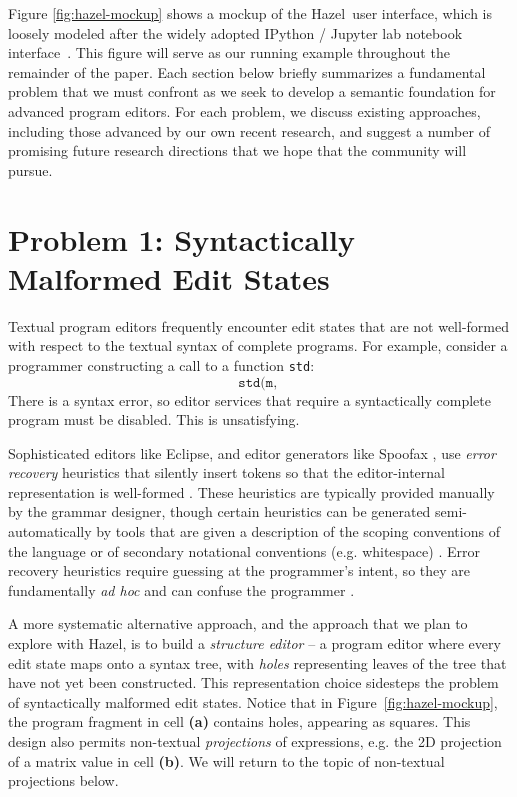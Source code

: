 \documentclass[letterpaper,USenglish]{lipics-v2016}
\newcommand{\Hazel}[0]{\textsf{Hazel}}
\newcommand{\HazelEnv}[0]{\Hazel}
\begin{document}
Figure \ref{fig:hazel-mockup} shows a mockup of the \Hazel ~user interface, which is loosely modeled after the widely adopted IPython / Jupyter lab notebook interface~\cite{PER-GRA:2007}. 
This figure will serve as our running example 
throughout the remainder of the paper. Each section below briefly summarizes a fundamental problem that we must confront as we seek to develop a semantic foundation for advanced program editors. For each problem, we discuss existing approaches, including those advanced by our own recent research, and suggest a number of promising future research directions that we hope that the community will pursue.

\section{Problem 1: Syntactically Malformed Edit States} 
Textual program editors frequently encounter edit states
that are not well-formed with respect to the textual syntax of complete
programs. For example, consider a programmer constructing a call to a function \lstinline{std}: 
\[
\texttt{std(m, }
\]
There is a syntax error, so editor services that require a syntactically
complete program must be disabled. This is unsatisfying. 

Sophisticated editors like Eclipse, and editor generators like Spoofax \cite{DBLP:conf/oopsla/KatsV10}, use \emph{error recovery} heuristics that silently insert tokens so that the editor-internal representation is well-formed \cite{DBLP:journals/siamcomp/AhoP72,charles1991practical,graham1979practical,DBLP:conf/oopsla/KatsJNV09}. These heuristics are typically provided manually by the grammar designer, though certain heuristics can be generated semi-automatically by tools that are given a description of the scoping conventions of the language or of secondary notational conventions (e.g. whitespace) \cite{DBLP:conf/oopsla/KatsJNV09,DBLP:conf/sle/JongeNKV09}. Error recovery heuristics require guessing at the programmer's intent, so they are fundamentally \emph{ad hoc} and can confuse the programmer \cite{DBLP:conf/oopsla/KatsJNV09}.

A more systematic alternative approach, and the approach that we plan to explore with \HazelEnv, is to build a
\emph{structure editor} -- a program editor where every edit state
maps onto a syntax tree, with \emph{holes} representing leaves of the tree
that have not yet been constructed.  This representation choice sidesteps the
problem of syntactically malformed edit states. Notice that in
Figure~\ref{fig:hazel-mockup}, the program fragment in cell
\textbf{(a)} contains holes, appearing as squares. This design also permits
non-textual \emph{projections} of expressions, e.g. 
the 2D projection of a matrix value in cell \textbf{(b)}.
We will return to the topic of non-textual projections below.
\end{document}

